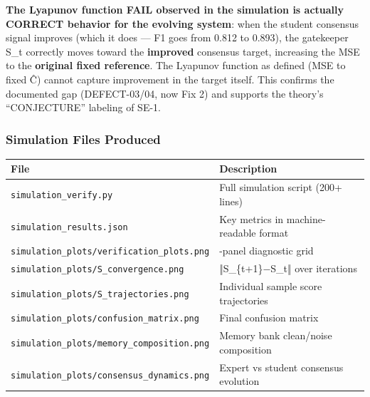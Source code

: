\documentclass[
  12pt,
]{ctexart}
\begin{document}
\textbf{The Lyapunov function FAIL observed in the simulation is
actually CORRECT behavior for the evolving system}: when the student
consensus signal improves (which it does --- F1 goes from 0.812 to
0.893), the gatekeeper S\_t correctly moves toward the \textbf{improved}
consensus target, increasing the MSE to the \textbf{original fixed
reference}. The Lyapunov function as defined (MSE to fixed Ĉ) cannot
capture improvement in the target itself. This confirms the documented
gap (DEFECT-03/04, now Fix 2) and supports the theory's ``CONJECTURE''
labeling of SE-1.

\subsubsection{Simulation Files
Produced}\label{simulation-files-produced}

\begin{longtable}[]{@{}
  >{\raggedright\arraybackslash}p{}
  >{\raggedright\arraybackslash}p{}@{}}
\toprule\noalign{}
\begin{minipage}[b]{\linewidth}\raggedright
File
\end{minipage} & \begin{minipage}[b]{\linewidth}\raggedright
Description
\end{minipage} \\
\midrule\noalign{}
\endhead
\bottomrule\noalign{}
\endlastfoot
\texttt{simulation\_verify.py} & Full simulation script (200+ lines) \\
\texttt{simulation\_results.json} & Key metrics in machine-readable
format \\
\texttt{simulation\_plots/verification\_plots.png} & 6-panel diagnostic
grid \\
\texttt{simulation\_plots/S\_convergence.png} & ‖S\_\{t+1\}−S\_t‖ over
iterations \\
\texttt{simulation\_plots/S\_trajectories.png} & Individual sample score
trajectories \\
\texttt{simulation\_plots/confusion\_matrix.png} & Final confusion
matrix \\
\texttt{simulation\_plots/memory\_composition.png} & Memory bank
clean/noise composition \\
\texttt{simulation\_plots/consensus\_dynamics.png} & Expert vs student
consensus evolution \\
\end{longtable}
\end{document}
